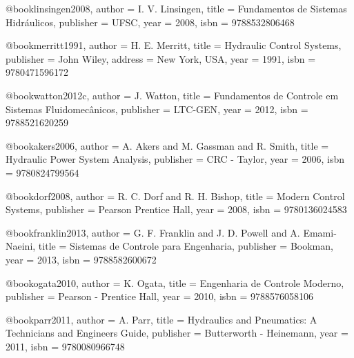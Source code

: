 @book{linsingen2008,
  author = {I. V. Linsingen},
  title = {Fundamentos de Sistemas Hidráulicos},
  publisher = {UFSC},
  year = {2008},
  isbn = {9788532806468}
}

@book{merritt1991,
  author = {H. E. Merritt},
  title = {Hydraulic Control Systems},
  publisher = {John Wiley},
  address = {New York, USA},
  year = {1991},
  isbn = {9780471596172}
}

@book{watton2012c,
  author = {J. Watton},
  title = {Fundamentos de Controle em Sistemas Fluidomecânicos},
  publisher = {LTC-GEN},
  year = {2012},
  isbn = {9788521620259}
}

@book{akers2006,
  author = {A. Akers and M. Gassman and R. Smith},
  title = {Hydraulic Power System Analysis},
  publisher = {CRC - Taylor},
  year = {2006},
  isbn = {9780824799564}
}

@book{dorf2008,
  author = {R. C. Dorf and R. H. Bishop},
  title = {Modern Control Systems},
  publisher = {Pearson Prentice Hall},
  year = {2008},
  isbn = {9780136024583}
}

@book{franklin2013,
  author = {G. F. Franklin and J. D. Powell and A. Emami-Naeini},
  title = {Sistemas de Controle para Engenharia},
  publisher = {Bookman},
  year = {2013},
  isbn = {9788582600672}
}

@book{ogata2010,
  author = {K. Ogata},
  title = {Engenharia de Controle Moderno},
  publisher = {Pearson - Prentice Hall},
  year = {2010},
  isbn = {9788576058106}
}

@book{parr2011,
  author = {A. Parr},
  title = {Hydraulics and Pneumatics: A Technicians and Engineers Guide},
  publisher = {Butterworth - Heinemann},
  year = {2011},
  isbn = {9780080966748}
}

